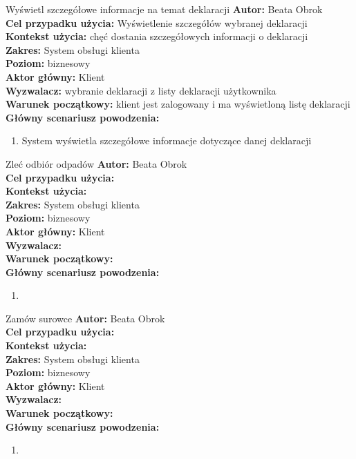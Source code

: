 \begin{usecase}{Wyświetl szczegółowe informacje na temat deklaracji}
	\textbf{Autor:} Beata Obrok \\
	\textbf{Cel przypadku użycia:} Wyświetlenie szczegółów wybranej deklaracji \\
	\textbf{Kontekst użycia:} chęć dostania szczegółowych informacji o deklaracji\\
	\textbf{Zakres:} System obsługi klienta \\
	\textbf{Poziom:} biznesowy \\
	\textbf{Aktor główny:} Klient\\
	\textbf{Wyzwalacz:} wybranie deklaracji z listy deklaracji użytkownika \\
	\textbf{Warunek początkowy:} klient jest zalogowany i ma wyświetloną listę deklaracji\\
	\textbf{Główny scenariusz powodzenia:} \\
		\begin{enumerate}
			\item System wyświetla szczegółowe informacje dotyczące danej deklaracji
		\end{enumerate}
\end{usecase}

\begin{usecase}{Zleć odbiór odpadów}
	\textbf{Autor:} Beata Obrok \\
	\textbf{Cel przypadku użycia:} \\
	\textbf{Kontekst użycia:} \\
	\textbf{Zakres:} System obsługi klienta \\
	\textbf{Poziom:} biznesowy \\
	\textbf{Aktor główny:} Klient\\
	\textbf{Wyzwalacz:} \\
	\textbf{Warunek początkowy:} \\
	\textbf{Główny scenariusz powodzenia:} \\
		\begin{enumerate}
			\item
		\end{enumerate}
\end{usecase}

\begin{usecase}{Zamów surowce}
	\textbf{Autor:} Beata Obrok \\
	\textbf{Cel przypadku użycia:} \\
	\textbf{Kontekst użycia:} \\
	\textbf{Zakres:} System obsługi klienta \\
	\textbf{Poziom:} biznesowy \\
	\textbf{Aktor główny:} Klient\\
	\textbf{Wyzwalacz:} \\
	\textbf{Warunek początkowy:} \\
	\textbf{Główny scenariusz powodzenia:} \\
		\begin{enumerate}
			\item
		\end{enumerate}
\end{usecase}

